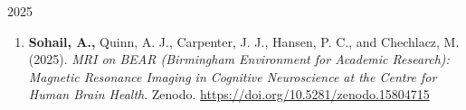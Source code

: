 \vspace{1em}
{2025}
\begin{enumerate}[]

\item \textbf{Sohail, A.,} Quinn, A. J., Carpenter, J. J., Hansen, P. C., and Chechlacz, M. (2025). \textit{MRI on BEAR (Birmingham Environment for Academic Research): Magnetic Resonance Imaging in Cognitive Neuroscience at the Centre for Human Brain Health}. Zenodo. \href{https://doi.org/10.5281/zenodo.15804715}{https://doi.org/10.5281/zenodo.15804715}

\end{enumerate}
